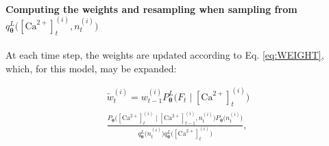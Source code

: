 \documentclass[10pt]{article}
\providecommand{\ve}[1]{\boldsymbol{#1}}
\providecommand{\ve}[1]{\boldsymbol{#1}}
\newcommand{\thetn}{\ve{\theta}}
\newcommand{\p}{P_{\thetn}}
\newcommand{\m}{m^{\ast}}
\newcommand{\Ca}{[\text{Ca}^{2+}]}
\begin{document}
%
%
%
%
%
\paragraph{Computing the weights and resampling when sampling from $q_{\thetn}^L\big(\Ca_t^{(i)}, n_t^{(i)}\big)$}

At each time step, the weights are updated according to Eq. \ref{eq:WEIGHT}, which, for this model, may be expanded:

\begin{multline} \label{aeq:cond_w}
\widetilde{w}_t^{(i)} =  w_{t-1}^{(i)}\p^L \big(F_t \mid \Ca_t^{(i)}\big)
\\ \frac{\p\big(\Ca_t^{(i)} \mid \Ca_{t-1}^{(i)}, n_t^{(i)}\big) \p\big(n_t^{(i)}\big)}{q_{\thetn}^L\big(n_t^{(i)}\big) q_{\thetn}^L\big(\Ca_t^{(i)}\big)},
\end{multline}
\end{document}
